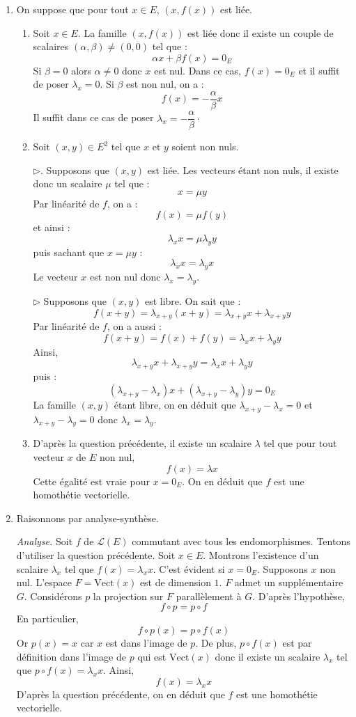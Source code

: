 \documentclass[a4paper,10pt]{report}
\begin{document}
\corr 
\begin{enumerate}
\item On suppose que pour tout $x \in E$, $(x, f(x))$ est liée.
\begin{enumerate}
\item Soit $x \in E$. La famille $(x, f(x))$ est liée donc il existe un couple de scalaires $(\alpha, \beta) \neq (0,0)$ tel que :
$$ \alpha x + \beta f(x) = 0_E$$
Si $\beta=0$ alors $\alpha \neq 0$ donc $x$ est nul. Dans ce cas, $f(x)=0_E$ et il suffit de poser $\lambda_x=0$. Si $\beta$ est non nul, on a :
$$ f(x) = - \dfrac{\alpha}{\beta} x$$
Il suffit dans ce cas de poser $\lambda_x = - \dfrac{\alpha}{\beta} \cdot$
\item Soit $(x,y) \in E^2$ tel que $x$ et $y$ soient non nuls.

\medskip

\noindent $\rhd$. Supposons que $(x,y)$ est liée. Les vecteurs étant non nuls, il existe donc un scalaire $\mu$ tel que :
$$ x = \mu y$$
Par linéarité de $f$, on a :
$$ f(x) = \mu f(y)$$
et ainsi :
$$ \lambda_x x = \mu \lambda_y  y$$
puis sachant que $x= \mu y$ :
$$ \lambda_x x = \lambda_y  x$$
Le vecteur $x$ est non nul donc $\lambda_x = \lambda_y$.

\medskip

\noindent $\rhd$ Supposons que $(x,y)$ est libre. On sait que :
$$ f(x+y) = \lambda_{x+y} (x+y) = \lambda_{x+y} x + \lambda_{x+y} y$$
Par linéarité de $f$, on a aussi :
$$ f(x+y) = f(x) + f(y) = \lambda_x x + \lambda_y y$$
Ainsi,
$$ \lambda_{x+y} x + \lambda_{x+y} y = \lambda_x x + \lambda_y y$$
puis :
$$ (\lambda_{x+y}- \lambda_x) x + (\lambda_{x+y}-\lambda_y) y =0_E$$
La famille $(x,y)$ étant libre, on en déduit que $\lambda_{x+y}- \lambda_x=0$ et $\lambda_{x+y}- \lambda_y=0$ donc $\lambda_x= \lambda_y$.
\item D'après la question précédente, il existe un scalaire $\lambda$ tel que pour tout vecteur $x$ de $E$ non nul,
$$ f(x)= \lambda x$$
Cette égalité est vraie pour $x=0_E$. On en déduit que $f$ est une homothétie vectorielle.
\end{enumerate}
\item Raisonnons par analyse-synthèse.

\medskip

\noindent \textit{Analyse.} Soit $f$ de $\mathcal{L}(E)$ commutant avec tous les endomorphismes. Tentons d'utiliser la question précédente. Soit $x \in E$. Montrons l'existence d'un scalaire $\lambda_x$ tel que $f(x)= \lambda_x x$. C'est évident si $x=0_E$. Supposons $x$ non nul. L'espace $F= \textrm{Vect}(x)$ est de dimension $1$. $F$ admet un supplémentaire $G$. Considérons $p$ la projection sur $F$ parallèlement à $G$. D'après l'hypothèse,
$$ f \circ p = p \circ f$$
En particulier,
$$ f \circ p (x) = p \circ f(x)$$
Or $p(x)=x$ car $x$ est dans l'image de $p$. De plus, $p \circ f(x)$ est par définition dans l'image de $p$ qui est $\textrm{Vect}(x)$ donc il existe un scalaire $\lambda_x$ tel que $p \circ f(x) = \lambda_x x$. Ainsi,
$$ f(x) = \lambda_x x$$
D'après la question précédente, on en déduit que $f$ est une homothétie vectorielle.


\end{enumerate}
\end{document}

